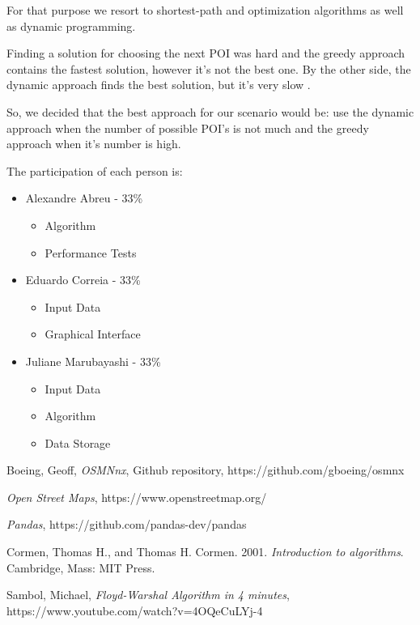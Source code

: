 \documentclass{article}
\begin{document}
For that purpose we resort to shortest-path and optimization algorithms as well as dynamic programming.\par

Finding a solution for choosing the next POI was hard and the greedy approach contains the fastest solution, however it's not the best one. By the other side, the dynamic approach finds the best solution, but it's very slow . \par

So, we decided that the best approach for our scenario would be: use the dynamic approach when the number of possible POI's is not much and the greedy approach when it's number is high. \par

The participation of each person is:
\begin{itemize}
\item Alexandre Abreu - 33\%

\begin{itemize}
    \item Algorithm
    \item Performance Tests
\end{itemize}

\item Eduardo Correia - 33\%

\begin{itemize}
    \item Input Data
    \item Graphical Interface
\end{itemize}

\item Juliane Marubayashi - 33\%

\begin{itemize}
    \item Input Data
    \item Algorithm
    \item Data Storage
\end{itemize}

\end{itemize}

\begin{thebibliography}{9}

Boeing, Geoff, \textit{OSMNnx}, Github repository, https://github.com/gboeing/osmnx

\textit{Open Street Maps}, https://www.openstreetmap.org/

\textit{Pandas}, https://github.com/pandas-dev/pandas

Cormen, Thomas H., and Thomas H. Cormen. 2001. \textit{Introduction to algorithms}. Cambridge, Mass: MIT Press.

Sambol, Michael, \textit{Floyd-Warshal Algorithm in 4 minutes}, https://www.youtube.com/watch?v=4OQeCuLYj-4

\end{thebibliography}
\end{document}
